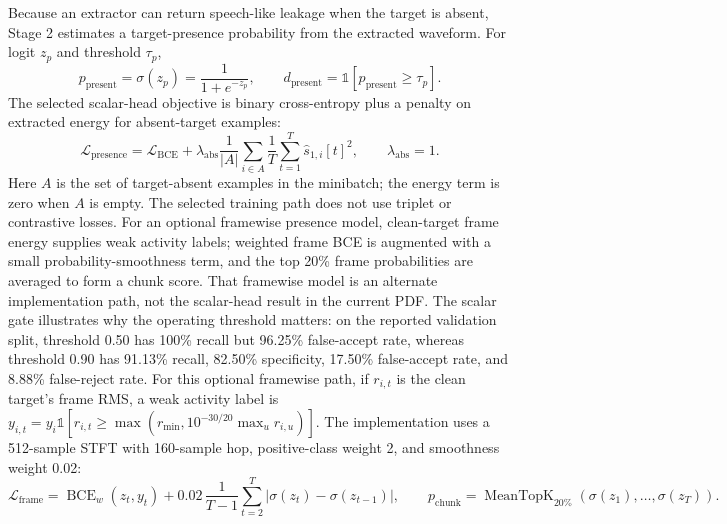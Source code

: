 Because an extractor can return speech-like leakage when the target is absent, Stage 2 estimates a target-presence probability from the extracted waveform. For logit $z_p$ and threshold $\tau_p$,
\begin{equation}
  p_{\mathrm{present}}=\sigma(z_p)=\frac{1}{1+e^{-z_p}},\qquad
  d_{\mathrm{present}}=\mathbb{1}[p_{\mathrm{present}}\geq\tau_p].
  \label{eq:presence-gate}
\end{equation}
The selected scalar-head objective is binary cross-entropy plus a penalty on extracted energy for absent-target examples:
\begin{equation}
  \mathcal{L}_{\mathrm{presence}}=\mathcal{L}_{\mathrm{BCE}}+\lambda_{\mathrm{abs}}
  \frac{1}{|A|}\sum_{i\in A}\frac{1}{T}\sum_{t=1}^{T}\hat{s}_{1,i}[t]^2,
  \qquad \lambda_{\mathrm{abs}}=1.
  \label{eq:presence-loss}
\end{equation}
Here $A$ is the set of target-absent examples in the minibatch; the energy term is zero when $A$ is empty. The selected training path does not use triplet or contrastive losses.
For an optional framewise presence model, clean-target frame energy supplies weak activity labels; weighted frame BCE is augmented with a small probability-smoothness term, and the top 20\% frame probabilities are averaged to form a chunk score. That framewise model is an alternate implementation path, not the scalar-head result in the current PDF. The scalar gate illustrates why the operating threshold matters: on the reported validation split, threshold 0.50 has 100\% recall but 96.25\% false-accept rate, whereas threshold 0.90 has 91.13\% recall, 82.50\% specificity, 17.50\% false-accept rate, and 8.88\% false-reject rate.
For this optional framewise path, if $r_{i,t}$ is the clean target's frame RMS, a weak activity label is $y_{i,t}=y_i\mathbb{1}[r_{i,t}\geq\max(r_{\min},10^{-30/20}\max_u r_{i,u})]$. The implementation uses a 512-sample STFT with 160-sample hop, positive-class weight 2, and smoothness weight 0.02:
\begin{equation}
  \mathcal{L}_{\mathrm{frame}}=\operatorname{BCE}_{w}(z_t,y_t)
  +0.02\,\frac{1}{T-1}\sum_{t=2}^{T}\left|\sigma(z_t)-\sigma(z_{t-1})\right|,
  \qquad
  p_{\mathrm{chunk}}=\operatorname{MeanTopK}_{20\%}\!\left(\sigma(z_1),\ldots,\sigma(z_T)\right).
  \label{eq:frame-presence-loss}
\end{equation}

